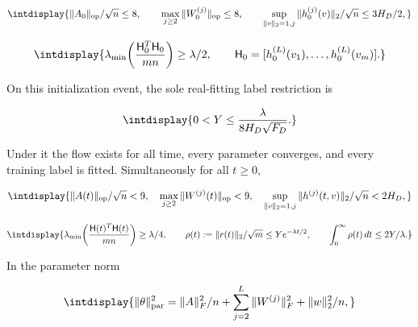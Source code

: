 \begingroup\renewcommand{\theHequation}{intdisplay.50}
\begin{equation*}
\intdisplay{
\|A_0\|_{\rm op}/\sqrt n\le8,\qquad
\max_{j\ge2}\|W_0^{(j)}\|_{\rm op}\le8,\qquad
\sup_{\|v\|_2=1,j}\|h_0^{(j)}(v)\|_2/\sqrt n\le3H_D/2,
}
\end{equation*}
\endgroup

\begingroup\renewcommand{\theHequation}{intdisplay.51}
\begin{equation*}
\intdisplay{
\lambda_{\min}\!\left(\frac{\mathsf H_0^T\mathsf H_0}{mn}\right)
\ge\lambda/2,\qquad
\mathsf H_0=[h_0^{(L)}(v_1),\ldots,h_0^{(L)}(v_m)].
}
\end{equation*}
\endgroup


On this initialization event, the sole real-fitting label restriction is


\begingroup\renewcommand{\theHequation}{intdisplay.52}
\begin{equation*}
\intdisplay{
0<Y\le\frac{\lambda}{8H_D\sqrt{F_D}}.
}
\end{equation*}
\endgroup


Under it the flow exists for all time, every parameter converges, and every training label is fitted. Simultaneously for all \(t\ge0\),


\begingroup\renewcommand{\theHequation}{intdisplay.53}
\begin{equation*}
\intdisplay{
\|A(t)\|_{\rm op}/\sqrt n<9,\quad
\max_{j\ge2}\|W^{(j)}(t)\|_{\rm op}<9,\quad
\sup_{\|v\|_2=1,j}\|h^{(j)}(t,v)\|_2/\sqrt n<2H_D,
}
\end{equation*}
\endgroup

\begingroup\renewcommand{\theHequation}{intdisplay.54}
\begin{equation*}
\intdisplay{
\lambda_{\min}\!\left(\frac{\mathsf H(t)^T\mathsf H(t)}{mn}\right)
\ge\lambda/4,\qquad
\rho(t):=\|r(t)\|_2/\sqrt m\le Ye^{-\lambda t/2},\qquad
\int_0^\infty\rho(t)\,dt\le2Y/\lambda.
}
\end{equation*}
\endgroup


In the parameter norm


\begingroup\renewcommand{\theHequation}{intdisplay.55}
\begin{equation*}
\intdisplay{
\|\theta\|_{\rm par}^2=
\|A\|_F^2/n+\sum_{j=2}^L\|W^{(j)}\|_F^2+\|w\|_2^2/n,
}
\end{equation*}
\endgroup


